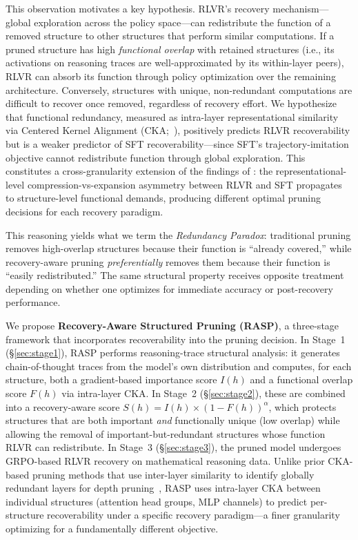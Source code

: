 This observation motivates a key hypothesis.
RLVR's recovery mechanism---global exploration across the policy space---can redistribute the function of a removed structure to other structures that perform similar computations.
If a pruned structure has high \emph{functional overlap} with retained structures (i.e., its activations on reasoning traces are well-approximated by its within-layer peers), RLVR can absorb its function through policy optimization over the remaining architecture.
Conversely, structures with unique, non-redundant computations are difficult to recover once removed, regardless of recovery effort.
We hypothesize that functional redundancy, measured as intra-layer representational similarity via Centered Kernel Alignment (CKA;~\citealp{kornblith2019cka}), positively predicts RLVR recoverability but is a weaker predictor of SFT recoverability---since SFT's trajectory-imitation objective cannot redistribute function through global exploration.
This constitutes a cross-granularity extension of the findings of \citet{rlsqueezes2026}: the representational-level compression-vs-expansion asymmetry between RLVR and SFT propagates to structure-level functional demands, producing different optimal pruning decisions for each recovery paradigm.

This reasoning yields what we term the \emph{Redundancy Paradox}: traditional pruning removes high-overlap structures because their function is ``already covered,'' while recovery-aware pruning \emph{preferentially} removes them because their function is ``easily redistributed.''
The same structural property receives opposite treatment depending on whether one optimizes for immediate accuracy or post-recovery performance.

We propose \textbf{Recovery-Aware Structured Pruning (RASP)}, a three-stage framework that incorporates recoverability into the pruning decision.
In Stage~1 (\S\ref{sec:stage1}), RASP performs reasoning-trace structural analysis: it generates chain-of-thought traces from the model's own distribution and computes, for each structure, both a gradient-based importance score $I(h)$ and a functional overlap score $F(h)$ via intra-layer CKA.
In Stage~2 (\S\ref{sec:stage2}), these are combined into a recovery-aware score $S(h) = I(h) \times (1 - F(h))^\alpha$, which protects structures that are both important \emph{and} functionally unique (low overlap) while allowing the removal of important-but-redundant structures whose function RLVR can redistribute.
In Stage~3 (\S\ref{sec:stage3}), the pruned model undergoes GRPO-based RLVR recovery on mathematical reasoning data.
Unlike prior CKA-based pruning methods that use inter-layer similarity to identify globally redundant layers for depth pruning~\citep{mpruner2024,lachance2024cka}, RASP uses intra-layer CKA between individual structures (attention head groups, MLP channels) to predict per-structure recoverability under a specific recovery paradigm---a finer granularity optimizing for a fundamentally different objective.

